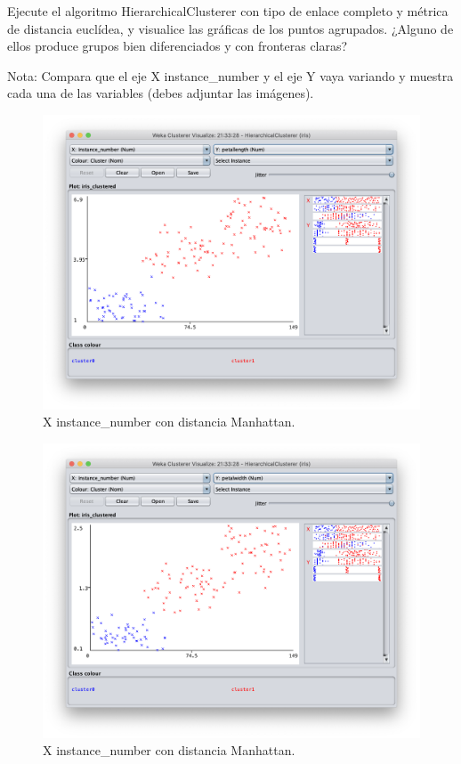 \documentclass[11pt]{exam}
\begin{document}
\begin{questions}
{\question Ejecute el algoritmo HierarchicalClusterer con tipo de enlace completo y métrica de distancia euclídea, y visualice las gráficas de los puntos agrupados. ¿Alguno de ellos produce grupos bien diferenciados y con fronteras claras?}

Nota: Compara que el eje X instance\_number y el eje Y vaya variando y muestra cada una de las variables (debes adjuntar las imágenes).

\begin{figure}[h]
	\centering
	\includegraphics[scale=0.5]{hc_petallenght.png}
	\caption{X instance\_number con distancia Manhattan.}
	\label{Captura_5}
\end{figure}

\begin{figure}[h]
	\centering
	\includegraphics[scale=0.5]{hc_petalwidth.png}
	\caption{X instance\_number con distancia Manhattan.}
	\label{Captura_6}
\end{figure}



\end{questions}
\end{document}
